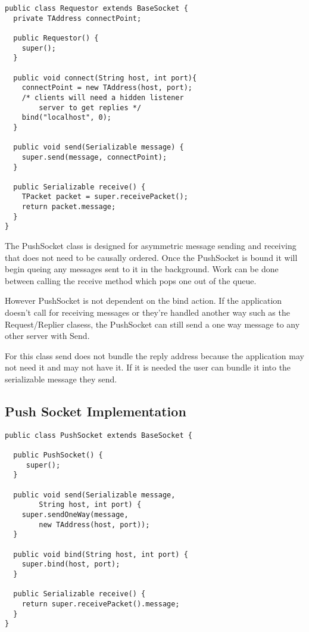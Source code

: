 \documentclass[11pt,journal,compsoc]{IEEEtran}
\begin{document}
\begin{lstlisting}
public class Requestor extends BaseSocket {
  private TAddress connectPoint;

  public Requestor() {
    super();
  }

  public void connect(String host, int port){
    connectPoint = new TAddress(host, port);
    /* clients will need a hidden listener
        server to get replies */
    bind("localhost", 0);
  }

  public void send(Serializable message) {
    super.send(message, connectPoint);
  }

  public Serializable receive() {
    TPacket packet = super.receivePacket();
    return packet.message;
  }
}

\end{lstlisting}

The PushSocket class is designed for asymmetric message sending and receiving that does not need to be causally ordered. Once the PushSocket is bound it will begin queing any messages sent to it in the background. Work can be done between calling the receive method which pops one out of the queue. 

However PushSocket is not dependent on the bind action. If the application doesn't call for receiving messages or they're handled another way such as the Request/Replier clasess, the PushSocket can still send a one way message to any other server with Send.

For this class send does not bundle the reply address because the application may not need it and may not have it. If it is needed the user can bundle it into the serializable message they send.

\subsection{Push Socket Implementation}
\begin{lstlisting}
public class PushSocket extends BaseSocket {

  public PushSocket() {
     super();
  }

  public void send(Serializable message,
        String host, int port) {
    super.sendOneWay(message,
        new TAddress(host, port));
  }

  public void bind(String host, int port) {
    super.bind(host, port);
  }

  public Serializable receive() {
    return super.receivePacket().message;
  }
}

\end{lstlisting}
\end{document}
